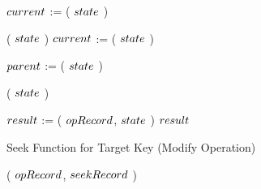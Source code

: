 \begin{limitscope}
\begin{algorithm}[tb]
{	 \While{\True}
   {
	    \label{lin:local-find|start|point:while:begin}
			$\cNode$ := \GetTop( $state$ )\;
			\label{lin:local-find|start|point:while:backtrack:begin}
    		
	    \While{\IsMarked( $\cNode$ )}
			{
			  
			   \RemoveFromTop( $state$ )\;
				 $\cNode$ := \GetTop( $state$ )\;
         
			}
			
			\BlankLine

			\If{\NeedCleanParentNode( $\opRecord$, $\cNode$ )}
			{ 
			   \label{lin:local-find|start|point:while:clean:begin}
				 $\pNode$ := \GetSecondToTop( $state$ )\; 
				 \If{\LNot(\IsClean( $\pNode$ ))}
				 {
						
											
				    \RemoveFromTop( $state$ )\;
						\Continue\;
						\label{lin:local-find|start|point:while:clean:end}
						\label{lin:local-find|start|point:while:backtrack:end}
				 }
			}
			
			
			\BlankLine
			
		
	    $\result$ := \FindAdmissible( $\opRecord$, $state$ )\;
	    \label{lin:local-find|start|point:while:find|admissible}
		  \lIf{ $\result$ $\neq$ \INADMISSIBLE }
			{
			   \Return $\result$
			}
			
			\label{lin:local-find|start|point:while:end}
	 }
	
	 \OptReturn[\ADMISSIBLE]
	 \label{lin:local-find|start|point:end}
}
\end{algorithm}












\begin{algorithm}[tb]
\caption{Seek Function for Target Key (Modify Operation)} 
\label{algo:local-seek:modify}
\DefineKeyWords
\DontPrintSemicolon
\Boolean \SeekForModify( $\opRecord$, $seekRecord$ )\;
\PrintSemicolon
\label{lin:local-seek|modify:begin}
\Begin
{
   
}
\end{algorithm}
\end{limitscope}
